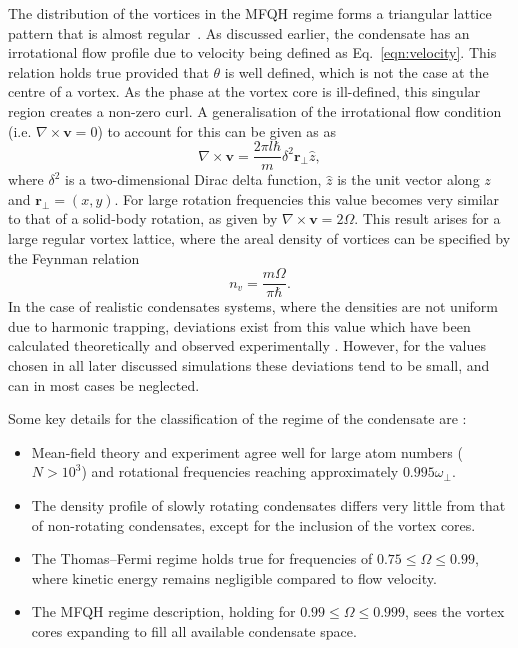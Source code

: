 The distribution of the vortices in the MFQH regime forms a triangular lattice pattern that is almost regular~\cite{Vtx:Schweikhard_prl_2004}. As discussed earlier, the condensate has an irrotational flow profile due to velocity being defined as Eq.~\eqref{eqn:velocity}. This relation holds true provided that $\theta$ is well defined, which is not the case at the centre of a vortex. As the phase at the vortex core is ill-defined, this singular region creates a non-zero curl. A generalisation of the irrotational flow condition (i.e. $\nabla\times \mathbf{v}=0$) to account for this can be given as as~\cite{BK:Pitaevskii_Stringari_2003,BK:Pethick_Smith_2008}
\begin{equation}
    \nabla\times \mathbf{v}=\frac{2\pi l\hbar}{m}\delta^{2}\mathbf{r}_\perp \hat{z},
\end{equation}
where $\delta^2$ is a two-dimensional Dirac delta function, $\hat{z}$ is the unit vector along $z$ and $\mathbf{r}_\perp=(x,y)$. For large rotation frequencies this value becomes very similar to that of a solid-body rotation, as given by $\nabla \times \mathbf{v}=2\Omega$. This result arises for a large regular vortex lattice, where the areal density of vortices can be specified by the Feynman relation~\cite{BK:Pitaevskii_Stringari_2003}
\begin{equation}\label{eqn:feynman}
n_{v} = \frac{m\Omega}{\pi\hbar}.
\end{equation}
In the case of realistic condensates systems, where the densities are not uniform due to harmonic trapping, deviations exist from this value which have been calculated theoretically \cite{Vtx:Sheey_pra_2004_2,Vtx:Sheey_pra_2004} and observed experimentally \cite{VTX:Coddington_pra_2004}. However, for the values chosen in all later discussed simulations these deviations tend to be small, and can in most cases be neglected.

Some key details for the classification of the regime of the condensate are \cite{BEC:Fetter_revmodphys_2009}:
\begin{itemize}
\item Mean-field theory and experiment agree well for large atom numbers ($N>10^3$) and rotational frequencies reaching approximately $0.995\omega_{\perp}$.
\item The density profile of slowly rotating condensates differs very little from that of non-rotating condensates, except for the inclusion of the vortex cores.
\item The Thomas--Fermi regime holds true for frequencies of $0.75 \leq \Omega \leq 0.99$, where kinetic energy remains negligible compared to flow velocity.
\item The MFQH regime description, holding for $0.99 \leq \Omega \leq 0.999$, sees the vortex cores expanding to fill all available condensate space. %
\end{itemize}

